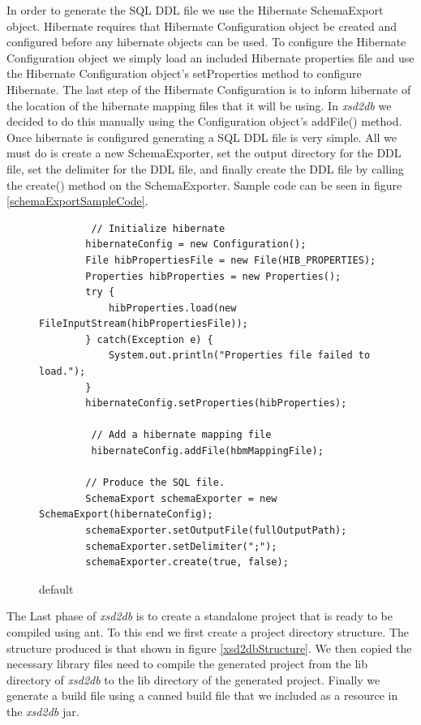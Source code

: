 In order to generate the SQL DDL file we use the Hibernate SchemaExport object.  Hibernate requires that Hibernate Configuration object be created and configured before any hibernate objects can be used.  To configure the Hibernate Configuration object we simply load an included Hibernate properties file and use the Hibernate Configuration object's setProperties method to configure Hibernate.  The last step of the Hibernate Configuration is to inform hibernate of the location of the hibernate mapping files that it will be using.  In \emph{xsd2db} we decided to do this manually using the Configuration object's addFile() method.   Once hibernate is configured generating a SQL DDL file is very simple.  All we must do is create a new SchemaExporter, set the output directory for the DDL file, set the delimiter for the DDL file, and finally create the DDL file by calling the create() method on the SchemaExporter.  Sample code can be seen in figure \ref{schemaExportSampleCode}.
\begin{figure}[htbp]
\begin{center}
\begin{verbatim}
         // Initialize hibernate
        hibernateConfig = new Configuration();
        File hibPropertiesFile = new File(HIB_PROPERTIES);
        Properties hibProperties = new Properties();
        try {
            hibProperties.load(new FileInputStream(hibPropertiesFile));
        } catch(Exception e) {
            System.out.println("Properties file failed to load.");
        }
        hibernateConfig.setProperties(hibProperties);

         // Add a hibernate mapping file
         hibernateConfig.addFile(hbmMappingFile);
         
        // Produce the SQL file.
        SchemaExport schemaExporter = new SchemaExport(hibernateConfig);
        schemaExporter.setOutputFile(fullOutputPath);
        schemaExporter.setDelimiter(";");
        schemaExporter.create(true, false);
\end{verbatim}
\caption{default}
\label{default}
\end{center}
\end{figure}

The Last phase of \emph{xsd2db} is to create a standalone project that is ready to be compiled using ant.  To this end we first create a project directory structure. The structure produced is that shown in figure \ref{xsd2dbStructure}.  We then copied the necessary library files need to compile the generated project from the lib directory of \emph{xsd2db} to the lib directory of the generated project.  Finally we generate a build file using a canned build file that we included as a resource in the \emph{xsd2db} jar.   

